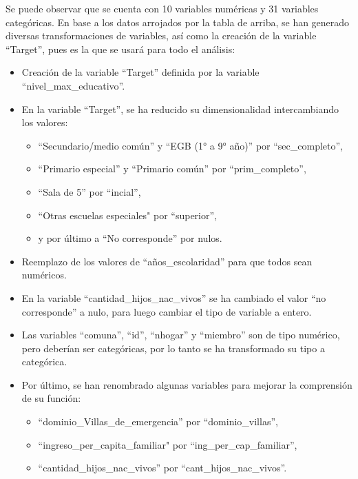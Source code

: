 \documentclass[a4paper]{article}
\begin{document}
    Se puede observar que se cuenta con 10 variables numéricas y 31 variables categóricas. 
    En base a los datos arrojados por la tabla de arriba, se han generado diversas transformaciones de variables, así como la creación de la variable ``Target'', pues es la que se usará para todo el análisis:
    \begin{itemize}
        \item Creación de la variable ``Target'' definida por la variable ``nivel\_max\_educativo''.
        \item En la variable ``Target'', se ha reducido su dimensionalidad intercambiando los valores:
            \begin{itemize}
                \item ``Secundario/medio común'' y ``EGB (1° a 9° año)'' por ``sec\_completo'',
                \item ``Primario especial'' y ``Primario común'' por ``prim\_completo'',
                \item ``Sala de 5'' por ``incial'',
                \item ``Otras escuelas especiales" por ``superior'',
                \item y por último a ``No corresponde'' por nulos.
            \end{itemize}
        \item Reemplazo de los valores de ``años\_escolaridad'' para que todos sean numéricos.
        \item En la variable ``cantidad\_hijos\_nac\_vivos'' se ha cambiado el valor ``no corresponde'' a nulo, para luego cambiar el tipo de variable a entero.
        \item Las variables ``comuna'', ``id'', ``nhogar'' y ``miembro'' son de tipo numérico, pero deberían ser categóricas, por lo tanto se ha transformado su tipo a categórica.
        \item Por último, se han renombrado algunas variables para mejorar la comprensión de su función:
            \begin{itemize}
                \item ``dominio\_Villas\_de\_emergencia'' por ``dominio\_villas'',
                \item ``ingreso\_per\_capita\_familiar" por ``ing\_per\_cap\_familiar'',
                \item ``cantidad\_hijos\_nac\_vivos'' por ``cant\_hijos\_nac\_vivos''.
            \end{itemize}
    \end{itemize}
\end{document}
